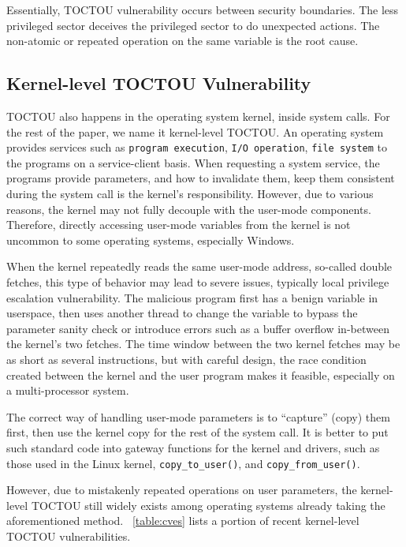 Essentially, TOCTOU vulnerability occurs between security boundaries. The less privileged sector deceives the privileged sector to do unexpected actions. The non-atomic or repeated operation on the same variable is the root cause.


\subsection{Kernel-level TOCTOU Vulnerability}


TOCTOU also happens in the operating system kernel, inside system calls. For the rest of the paper, we name it kernel-level TOCTOU. An operating system provides services such as \texttt{program execution}, \texttt{I/O operation}, \texttt{file system} to the programs on a service-client basis. When requesting a system service, the programs provide parameters, and how to invalidate them, keep them consistent during the system call is the kernel's responsibility. However, due to various reasons, the kernel may not fully decouple with the user-mode components. Therefore, directly accessing user-mode variables from the kernel is not uncommon to some operating systems, especially Windows.

When the kernel repeatedly reads the same user-mode address, so-called double fetches, this type of behavior may lead to severe issues, typically local privilege escalation vulnerability. The malicious program first has a benign variable in userspace, then uses another thread to change the variable to bypass the parameter sanity check or introduce errors such as a buffer overflow in-between the kernel's two fetches. The time window between the two kernel fetches may be as short as several instructions,  but with careful design, the race condition created between the kernel and the user program makes it feasible, especially on a multi-processor system.



The correct way of handling user-mode parameters is to ``capture'' (copy) them first, then use the kernel copy for the rest of the system call. It is better to put such standard code into gateway functions for the kernel and drivers, such as those used in the Linux kernel, \texttt{copy\_to\_user()}, and \texttt{copy\_from\_user()}.

However, due to mistakenly repeated operations on user parameters, the kernel-level TOCTOU still widely exists among operating systems already taking the aforementioned method. ~\autoref{table:cves} lists a portion of recent kernel-level TOCTOU vulnerabilities.

